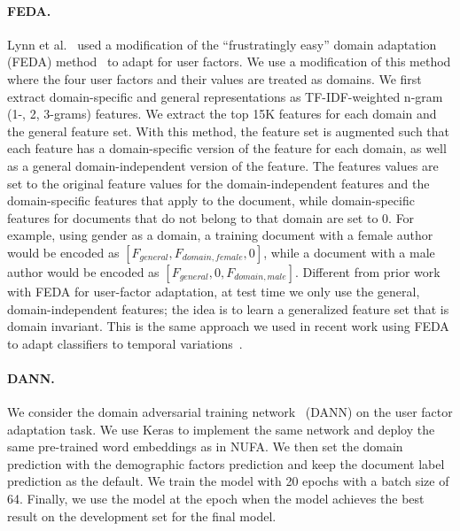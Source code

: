 \paragraph{FEDA.} 
Lynn et al.~\cite{lynn2017human} used a modification of the ``frustratingly easy'' domain adaptation (FEDA) method~\cite{daume2007frustratingly} to adapt for user factors. 
We use a modification of this method where the four user factors and their values are treated as domains.
We first extract domain-specific and general representations as TF-IDF-weighted n-gram (1-, 2, 3-grams) features. We extract the top 15K features for each domain and the general feature set.
With this method, the feature set is augmented such that each feature has a domain-specific version of the feature for each domain, as well as a general domain-independent version of the feature.
The features values are set to the original feature values for the domain-independent features and the domain-specific features that apply to the document, while domain-specific features for documents that do not belong to that domain are set to $0$.
For example, using gender as a domain, a training document with a female author would be encoded as $[F_{general}, F_{domain, female}, 0]$, while a document with a male author would be encoded as $[F_{general}, 0, F_{domain, male}]$.
Different from prior work with FEDA for user-factor adaptation, 
at test time we only use the general, domain-independent features;
the idea is to learn a generalized feature set that is domain invariant.
This is the same approach we used in recent work using FEDA to adapt classifiers to temporal variations~\cite{huang2018examining}.


\paragraph{DANN.} We consider the domain adversarial training network~\cite{ganin2016domain} (DANN) on the user factor adaptation task. We use Keras to implement the same network and deploy the same pre-trained word embeddings as in NUFA. We then set the domain prediction with the demographic factors prediction and keep the document label prediction as the default. We train the model with 20 epochs with a batch size of 64. Finally, we use the model at the epoch when the model achieves the best result on the development set for the final model.


